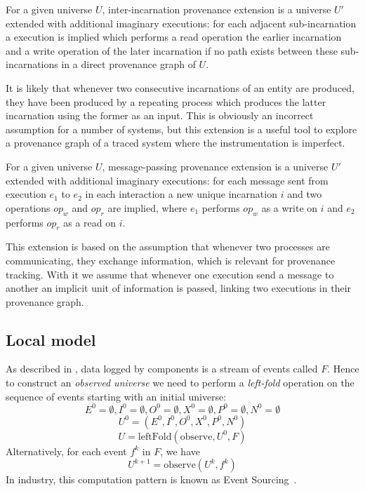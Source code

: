 \begin{definition} For a given universe $U$, inter-incarnation provenance extension is a universe $U'$ extended with additional imaginary executions: for each adjacent sub-incarnation a execution is implied which performs a read operation the earlier incarnation and a write operation of the later incarnation if no path exists between these sub-incarnations in a direct provenance graph of $U$.
\end{definition}

It is likely that whenever two consecutive incarnations of an entity are produced, they have been produced by a repeating process which produces the latter incarnation using the former as an input. This is obviously an incorrect assumption for a number of systems, but this extension is a useful tool to explore a provenance graph of a traced system where the instrumentation is imperfect.

\begin{definition}  For a given universe $U$, message-passing provenance extension is a universe $U'$ extended with additional imaginary executions: for each message sent from execution $e_1$ to $e_2$ in each interaction a new unique incarnation $i$ and two operations $op_w$ and $op_r$ are implied, where $e_1$ performs $op_w$ as a write on $i$ and $e_2$ performs $op_r$ as a read on $i$.
\end{definition}

This extension is based on the assumption that whenever two processes are communicating, they exchange information, which is relevant for provenance tracking. With it we assume that whenever one execution send a message to another an implicit unit of information is passed, linking two executions in their provenance graph.

\subsection{Local model}\label{sec:local-model}

As described in , data logged by components is a stream of events called $F$. Hence to construct an \textit{observed universe} we need to perform a \textit{left-fold} operation on the sequence of events starting with an initial universe:
\[ E^0 = \emptyset, I^0 = \emptyset, O^0 = \emptyset, X^0 = \emptyset, P^0 = \emptyset, N^0 = \emptyset \]
\[ U^0 = (E^0,I^0,O^0,X^0,P^0,N^0) \]
\[ U = \mathrm{leftFold}(\mathrm{observe}, U^0, F) \]%
%
Alternatively, for each event $f^{k}$ in $F$, %
we have
%
\[ U^{k+1} = \mathrm{observe}(U^k, f^k) \]
%
In industry, this computation pattern is known as Event Sourcing~\cite{EventSourcing2020Aug}.

